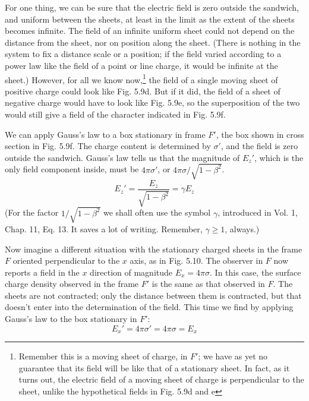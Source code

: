 For one thing, we can be sure that the electric field is zero outside
the sandwich, and uniform between the sheets, at least in the limit
as the extent of the sheets becomes infinite. The field of an infinite
uniform sheet could not depend on the distance from the sheet, nor
on position along the sheet. (There is nothing in the system to fix
a distance scale or a position; if the field varied according to a power
law like the field of a point or line charge, it would be infinite at the
sheet.) However, for all
we know now,\footnote{Remember this is a moving sheet of charge, in $F'$; we have as yet no guarantee that
its field will be like that of a stationary sheet. In fact, as it turns out, the electric field
of a moving sheet of charge is perpendicular to the sheet, unlike the hypothetical fields
in Fig. 5.9d and e} the field of a single moving
sheet of positive charge could look like Fig. 5.9d. But if it did, the
field of a sheet of negative charge would have to look like Fig. 5.9e,
so the superposition of the two would still give a field of the character
indicated in Fig. 5.9f.

We can apply Gauss's law to a box stationary in frame $F'$, the box
shown in cross section in Fig. 5.9f. The charge content is determined
by $\sigma'$, and the field is zero outside the sandwich. Gauss's law tells us
that the magnitude of $E_z'$, which is the only field component inside,
must be $4\pi\sigma'$, or $4\pi\sigma/\sqrt{1-\beta^2}$.
\begin{equation*}
  E_z' = \frac{E_z}{\sqrt{1-\beta^2}} = \gamma E_z
\end{equation*}
(For the factor $1/\sqrt{1-\beta^2}$ we shall often use the symbol $\gamma$, introduced
in Vol. 1, Chap. 11, Eq. 13. It saves a lot of writing. Remember,
$\gamma\ge1$, always.)

Now imagine a different situation with the stationary charged
sheets in the frame $F$ oriented perpendicular to the $x$ axis, as in
Fig. 5.10. The observer in $F$ now reports a field in the $x$ direction of
magnitude $E_x=4\pi\sigma$. In this case, the surface charge density observed
in the frame $F'$ is the same as that observed in $F$. The sheets
are not contracted; only the distance between them is contracted, but
that doesn't enter into the determination of the field. This time we
find by applying Gauss's law to the box stationary in $F'$:
\begin{equation}
  E_x' = 4\pi\sigma' = 4\pi\sigma = E_x
\end{equation}

